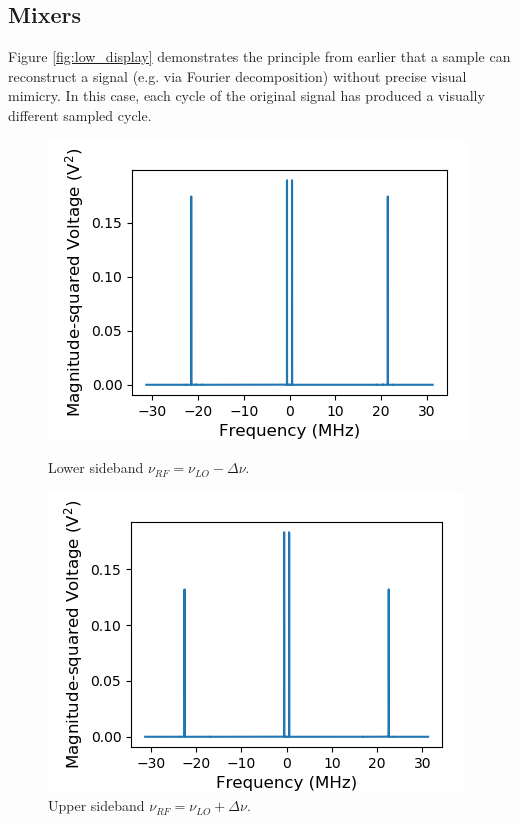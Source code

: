 \documentclass[a4paper]{article}
\begin{document}
\subsection{Mixers}


Figure \ref{fig:low_display} demonstrates the principle from earlier that a sample can reconstruct a signal (e.g. via Fourier decomposition) without precise visual mimicry. In this case, each cycle of the original signal has produced a visually different sampled cycle. 

\begin{figure}
\centering
\begin{minipage}{.5\textwidth}
	\centering
	\includegraphics[width=.8\linewidth]{7-1/l_power}
	\caption{Lower sideband $\nu_{RF} = \nu_{LO} - \Delta \nu$.}
	\label{fig:low_pow}
\end{minipage}%
\begin{minipage}{.5\textwidth}
	\centering
	\includegraphics[width=.8\linewidth]{7-1/h_power}
	\caption{Upper sideband $\nu_{RF} = \nu_{LO} + \Delta \nu$.}
	\label{fig:high_pow}
\end{minipage}
\end{figure}
\end{document}
